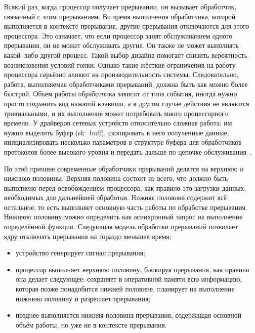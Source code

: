 Всякий раз, когда процессор получает прерывании, он вызывает обработчик, связанный с этим прерыванием. Во время выполнения обработчика, которой выполняется в контексте прерывания, другие прерывания отключаются для этого процессора. Это означает, что если процессор занят обслуживанием одного прерывания, он не может обслуживать другие. Он также не может выполнять какой--либо другой процесс. Такой выбор дизайна помогает снизить вероятность возникновения условий гонки. Однако такие жёсткие ограничения на работу процессора серьёзно влияют на производительность системы. Следовательно, работа, выполняемая обработчиками прерываний, должна быть как можно более быстрой. Объем работы обработчика  зависит от типа события, иногда нужно просто сохранить код нажатой клавиши, а в другом случае действия не являются тривиальными, и их выполнение может потребовать много процессорного времени. У драйверов сетевых устройств относительно сложная работа: им нужно выделить буфер (sk\_buff), скопировать в него полученные данные, инициализировать несколько параметров в структуре буфера для обработчиков протоколов более высокого уровня и передать дальше по цепочке обслуживания~\cite{net}. 

По этой причине современные обработчики прерываний делятся на верхнюю и нижнюю половины. Верхняя половина состоит из всего, что должно быть выполнено перед освобождением процессора, как правило это загрузки данных, необходимых для дальнейшей обработки. Нижняя половина содержит всё остальное, то есть выполняет основную часть работы по обработке прерывания. Нижнюю половину можно определить как асинхронный запрос на выполнение определённой
функции. Следующая модель обработки прерываний позволяет ядру отключать прерывания на гораздо меньшее время:
\begin{itemize}[label=---]
	\item устройство генерирует сигнал прерывания;
	\item процессор выполняет верхнюю половину, блокируя прерывания, как правило она делает следующее: сохраняет в оперативной памяти всю информацию, которая позже понадобится нижней половине, планирует на выполнение нижнюю половину и разрешает прерывания;
	\item позднее выполняется нижняя половина прерывания, содержащая основной объём работы, но уже не в контексте прерывания.
\end{itemize}

